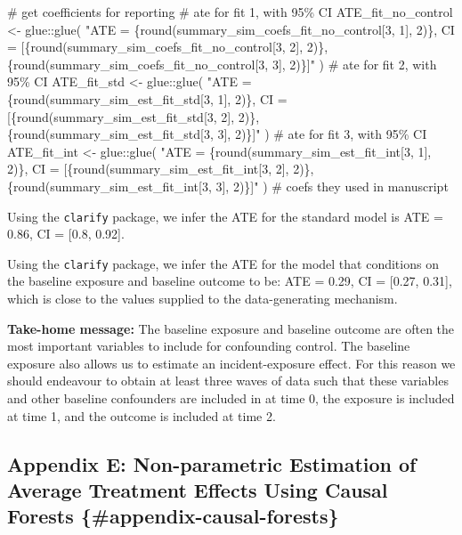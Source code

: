 \documentclass[
  singlecolumn]{article}
\newenvironment{Shaded}{}{}
\newcommand{\CommentTok}[1]{\textcolor[rgb]{0.42,0.45,0.49}{#1}}
\newcommand{\FunctionTok}[1]{\textcolor[rgb]{0.44,0.26,0.76}{#1}}
\newcommand{\NormalTok}[1]{\textcolor[rgb]{0.14,0.16,0.18}{#1}}
\newcommand{\OtherTok}[1]{\textcolor[rgb]{0.44,0.26,0.76}{#1}}
\newcommand{\SpecialCharTok}[1]{\textcolor[rgb]{0.00,0.36,0.77}{#1}}
\newcommand{\StringTok}[1]{\textcolor[rgb]{0.01,0.18,0.38}{#1}}
\begin{document}
\begin{Shaded}
\begin{Highlighting}[]
\CommentTok{\# get coefficients for reporting}
\CommentTok{\# ate for fit 1, with 95\% CI}
\NormalTok{ATE\_fit\_no\_control  }\OtherTok{\textless{}{-}}\NormalTok{ glue}\SpecialCharTok{::}\FunctionTok{glue}\NormalTok{(}
  \StringTok{"ATE = \{round(summary\_sim\_coefs\_fit\_no\_control[3, 1], 2)\}, }
\StringTok{  CI = [\{round(summary\_sim\_coefs\_fit\_no\_control[3, 2], 2)\},}
\StringTok{  \{round(summary\_sim\_coefs\_fit\_no\_control[3, 3], 2)\}]"}
\NormalTok{)}
\CommentTok{\# ate for fit 2, with 95\% CI}
\NormalTok{ATE\_fit\_std }\OtherTok{\textless{}{-}}\NormalTok{ glue}\SpecialCharTok{::}\FunctionTok{glue}\NormalTok{(}
  \StringTok{"ATE = \{round(summary\_sim\_est\_fit\_std[3, 1], 2)\}, }
\StringTok{  CI = [\{round(summary\_sim\_est\_fit\_std[3, 2], 2)\},}
\StringTok{  \{round(summary\_sim\_est\_fit\_std[3, 3], 2)\}]"}
\NormalTok{)}
\CommentTok{\# ate for fit 3, with 95\% CI}
\NormalTok{ATE\_fit\_int }\OtherTok{\textless{}{-}}
\NormalTok{  glue}\SpecialCharTok{::}\FunctionTok{glue}\NormalTok{(}
    \StringTok{"ATE = \{round(summary\_sim\_est\_fit\_int[3, 1], 2)\},}
\StringTok{    CI = [\{round(summary\_sim\_est\_fit\_int[3, 2], 2)\},}
\StringTok{    \{round(summary\_sim\_est\_fit\_int[3, 3], 2)\}]"}
\NormalTok{  )}
\CommentTok{\# coefs they used in manuscript}
\end{Highlighting}
\end{Shaded}

Using the \texttt{clarify} package, we infer the ATE for the standard
model is ATE = 0.86, CI = {[}0.8, 0.92{]}.

Using the \texttt{clarify} package, we infer the ATE for the model that
conditions on the baseline exposure and baseline outcome to be: ATE =
0.29, CI = {[}0.27, 0.31{]}, which is close to the values supplied to
the data-generating mechanism.

\textbf{Take-home message:} The baseline exposure and baseline outcome
are often the most important variables to include for confounding
control. The baseline exposure also allows us to estimate an
incident-exposure effect. For this reason we should endeavour to obtain
at least three waves of data such that these variables and other
baseline confounders are included in at time 0, the exposure is included
at time 1, and the outcome is included at time 2.

\newpage{}

\subsection{Appendix E: Non-parametric Estimation of Average Treatment
Effects Using Causal Forests
\{\#appendix-causal-forests\}}\label{appendix-e}
\end{document}
